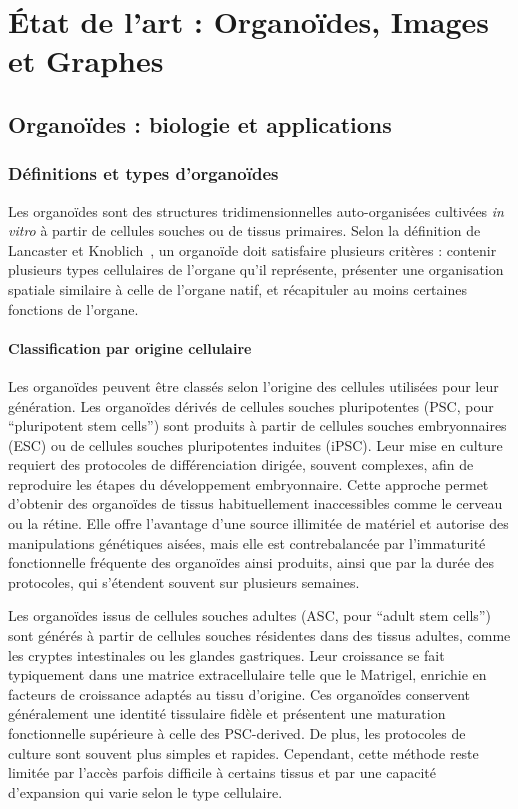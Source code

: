 
\chapter{État de l'art : Organoïdes, Images et Graphes}

\section{Organoïdes : biologie et applications}

\subsection{Définitions et types d'organoïdes}

Les organoïdes sont des structures tridimensionnelles auto-organisées cultivées \textit{in vitro} à partir de cellules souches ou de tissus primaires. Selon la définition de Lancaster et Knoblich~\cite{Lancaster2014}, un organoïde doit satisfaire plusieurs critères : contenir plusieurs types cellulaires de l'organe qu'il représente, présenter une organisation spatiale similaire à celle de l'organe natif, et récapituler au moins certaines fonctions de l'organe.

\subsubsection{Classification par origine cellulaire}

Les organoïdes peuvent être classés selon l'origine des cellules utilisées pour leur génération. Les organoïdes dérivés de cellules souches pluripotentes (PSC, pour ``pluripotent stem cells'') sont produits à partir de cellules souches embryonnaires (ESC) ou de cellules souches pluripotentes induites (iPSC). Leur mise en culture requiert des protocoles de différenciation dirigée, souvent complexes, afin de reproduire les étapes du développement embryonnaire. Cette approche permet d'obtenir des organoïdes de tissus habituellement inaccessibles comme le cerveau ou la rétine. Elle offre l'avantage d'une source illimitée de matériel et autorise des manipulations génétiques aisées, mais elle est contrebalancée par l'immaturité fonctionnelle fréquente des organoïdes ainsi produits, ainsi que par la durée des protocoles, qui s'étendent souvent sur plusieurs semaines.

Les organoïdes issus de cellules souches adultes (ASC, pour ``adult stem cells'') sont générés à partir de cellules souches résidentes dans des tissus adultes, comme les cryptes intestinales ou les glandes gastriques. Leur croissance se fait typiquement dans une matrice extracellulaire telle que le Matrigel, enrichie en facteurs de croissance adaptés au tissu d'origine. Ces organoïdes conservent généralement une identité tissulaire fidèle et présentent une maturation fonctionnelle supérieure à celle des PSC-derived. De plus, les protocoles de culture sont souvent plus simples et rapides. Cependant, cette méthode reste limitée par l'accès parfois difficile à certains tissus et par une capacité d'expansion qui varie selon le type cellulaire.

